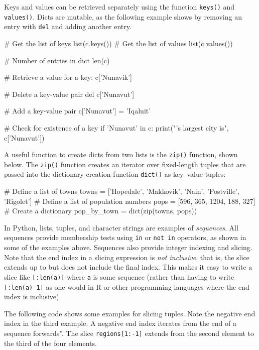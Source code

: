Keys and values can be retrieved separately using the function \texttt{keys()} and \texttt{values()}. Dicts are mutable, as the following example shows by removing an entry with \texttt{del} and adding another entry.

\begin{samepage}
\begin{pythoncode}
# Get the list of keys
list(c.keys())
# Get the list of values
list(c.values())

# Number of entries in dict
len(c)

# Retrieve a value for a key:
c['Nunavik']

# Delete a key-value pair
del c['Nunavut']

# Add a key-value pair
c['Nunavut'] = 'Iqaluit'

# Check for existence of a key
if 'Nunavut' in c:
    print("\nNunavut's largest city is", c['Nunavut'])
\end{pythoncode}
\end{samepage}

A useful function to create dicts from two lists is the \texttt{zip()} function, shown below. The \texttt{zip()} function creates an iterator over fixed-length tuples that are passed into the dictionary creation function \texttt{dict()} as key--value tuples:

\begin{samepage}
\begin{pythoncode}
# Define a list of towns
towns = ['Hopedale', 'Makkovik', 'Nain', 'Postville', 'Rigolet']
# Define a list of population numbers
pops = [596, 365, 1204, 188, 327]
# Create a dictionary
pop_by_town = dict(zip(towns, pops))
\end{pythoncode}
\end{samepage}

In Python, lists, tuples, and character strings are examples of \emph{sequences}. All sequences provide membership tests using \texttt{in} or \texttt{not in} operators, as shown in some of the examples above. Sequences also provide integer indexing and slicing.  Note that the end index in a slicing expression is \emph{not inclusive}, that is, the slice extends up to but does not include the final index. This makes it easy to write a slice like \texttt{[:len(a)]} where \texttt{a} is some sequence (rather than having to write \texttt{[:len(a)-1]} as one would in R or other programming languages where the end index is inclusive).

The following code shows some examples for slicing tuples. Note the negative end index in the third example. A negative end index iterates from the end of a sequence forwards''. The slice \texttt{regions[1:-1]} extends from the second element to the third of the four elements. 

